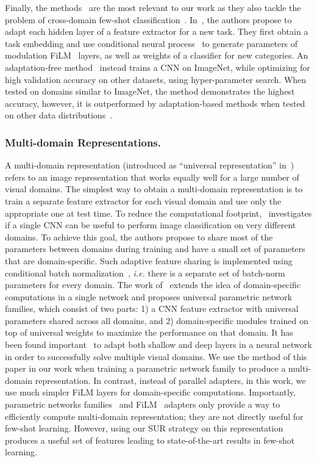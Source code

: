 \documentclass[runningheads]{llncs}
\begin{document}
Finally, the
methods~\cite{requeima2019fast,saikia2020optimized} are the most relevant to our
work as they also tackle the problem of cross-domain few-shot
classification~\cite{triantafillou2019meta}. In~\cite{requeima2019fast},
the authors propose to
adapt each hidden layer of a feature extractor for a new task. They first obtain
a task embedding and use conditional neural
process~\cite{garnelo2018conditional} to generate parameters of modulation FiLM~\cite{perez2018film} layers,
as well as weights of a classifier for new categories.
An adaptation-free method~\cite{saikia2020optimized} instead trains a CNN on
ImageNet, while optimizing for high validation accuracy on other datasets, using
hyper-parameter search. When tested on domains similar to ImageNet, the method
demonstrates the highest accuracy, however, it is outperformed by
adaptation-based methods when tested on other data distributions~\cite{saikia2020optimized}.

\subsubsection{Multi-domain Representations.}
A multi-domain representation (introduced as ``universal representation''
in~\cite{bilen2017universal}) refers to an image representation that works
equally well for a large number
of visual domains. The simplest way to obtain a multi-domain representation is to
train a separate feature extractor for each visual domain and use only the
appropriate one at test time. To reduce the computational
footprint,~\cite{bilen2017universal} investigates if a single CNN can be useful
to perform image classification on very different domains. To achieve this goal,
the authors propose to share most of the parameters between domains during
training and have a small set of parameters that are domain-specific. Such
adaptive feature sharing is implemented using conditional batch
normalization~\cite{batchnorm}, \textit{i.e.} there is a separate set of batch-norm
parameters for every domain. The work of~\cite{rebuffi2018efficient} extends the
idea of domain-specific computations in a single network and proposes universal
parametric network families, which consist of two parts: 1) a CNN feature
extractor with universal parameters shared across all domains, and 2)
domain-specific modules trained on top of universal weights to maximize the
performance on that domain. It has been found
important~\cite{rebuffi2018efficient} to adapt both shallow and deep layers in a
neural network in order to successfully solve multiple visual domains. We use
the method of this paper in our work when training a parametric network family
to produce a multi-domain representation. In contrast, instead of parallel
adapters, in this work, we use much simpler FiLM layers for domain-specific
computations. Importantly, parametric networks families~\cite{rebuffi2018efficient}
and FiLM~\cite{perez2018film} adapters only provide a way to efficiently
compute multi-domain representation; they are not directly useful for few-shot
learning. However, using our SUR strategy on this representation produces
a useful set of features leading to state-of-the-art results in few-shot learning.
 
\end{document}

